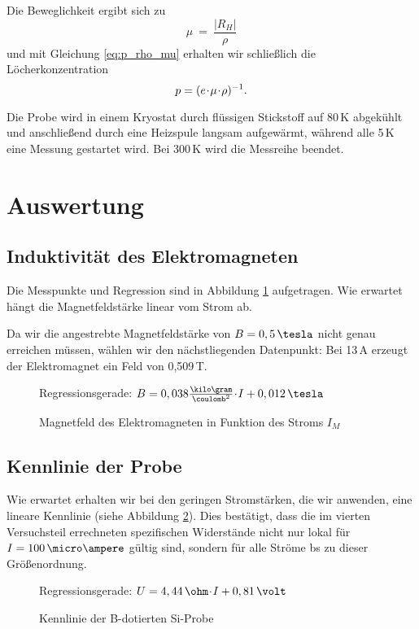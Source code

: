 Die Beweglichkeit ergibt sich zu
\begin{equation}
\mu ~=~ \frac{|R_H|}{\rho}
\end{equation}
und mit Gleichung \eqref{eq:p_rho_mu} erhalten wir schließlich die Löcherkonzentration
\begin{equation}
p = (e \!\cdot\! \mu \!\cdot\! \rho)^{-1}.
\end{equation}

Die Probe wird in einem Kryostat durch flüssigen Stickstoff auf 80\,K abgekühlt und anschließend durch eine Heizspule langsam aufgewärmt, während alle 5\,K eine Messung gestartet wird. Bei 300\,K wird die Messreihe beendet.

\newpage
\section{Auswertung}

\subsection{Induktivität des Elektromagneten}
Die Messpunkte und Regression sind in Abbildung \ref{fig:plot_B} aufgetragen. Wie erwartet hängt die Magnetfeldstärke linear vom Strom ab.

Da wir die angestrebte Magnetfeldstärke von $B = 0,5 \,\tesla$ nicht genau erreichen müssen, wählen wir den nächstliegenden Datenpunkt: Bei 13\,A erzeugt der Elektromagnet ein Feld von 0,509\,T.

\begin{figure}[p]
\centering

\caption{Magnetfeld des Elektromagneten in Funktion des Stroms $I_M$}
\label{fig:plot_B}
\vspace{-0.5ex}
Regressionsgerade: $B = 0,038 \frac{\kilo\gram}{\coulomb^2}  \cdt  I  +  0,012\,\tesla$
\end{figure}

\subsection{Kennlinie der Probe}
Wie erwartet erhalten wir bei den geringen Stromstärken, die wir anwenden, eine lineare Kennlinie (siehe Abbildung \ref{fig:plot_Kenn}). Dies bestätigt, dass die im vierten Versuchsteil errechneten spezifischen Widerstände nicht nur lokal für $I = 100\,\micro\ampere$ gültig sind, sondern für alle Ströme bs zu dieser Größenordnung.

\begin{figure}[p]
\centering

\caption{Kennlinie der \textsf{B}-dotierten \textsf{Si}-Probe}
\label{fig:plot_Kenn}
\vspace{-0.5ex}
Regressionsgerade: $U = 4,44\,\ohm \cdt  I  +  0,81\,\volt$
\end{figure}

